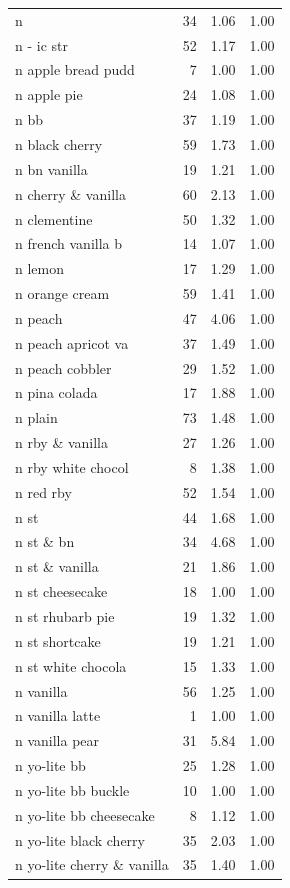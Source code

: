 \begin{table}
\begin{tabular}{lrrr}
n & 34 & 1.06 & 1.00 \\
n - ic str & 52 & 1.17 & 1.00 \\
n apple bread pudd & 7 & 1.00 & 1.00 \\
n apple pie & 24 & 1.08 & 1.00 \\
n bb & 37 & 1.19 & 1.00 \\
n black cherry & 59 & 1.73 & 1.00 \\
n bn vanilla & 19 & 1.21 & 1.00 \\
n cherry \& vanilla & 60 & 2.13 & 1.00 \\
n clementine & 50 & 1.32 & 1.00 \\
n french vanilla b & 14 & 1.07 & 1.00 \\
n lemon & 17 & 1.29 & 1.00 \\
n orange cream & 59 & 1.41 & 1.00 \\
n peach & 47 & 4.06 & 1.00 \\
n peach apricot va & 37 & 1.49 & 1.00 \\
n peach cobbler & 29 & 1.52 & 1.00 \\
n pina colada & 17 & 1.88 & 1.00 \\
n plain & 73 & 1.48 & 1.00 \\
n rby \& vanilla & 27 & 1.26 & 1.00 \\
n rby white chocol & 8 & 1.38 & 1.00 \\
n red rby & 52 & 1.54 & 1.00 \\
n st & 44 & 1.68 & 1.00 \\
n st \& bn & 34 & 4.68 & 1.00 \\
n st \& vanilla & 21 & 1.86 & 1.00 \\
n st cheesecake & 18 & 1.00 & 1.00 \\
n st rhubarb pie & 19 & 1.32 & 1.00 \\
n st shortcake & 19 & 1.21 & 1.00 \\
n st white chocola & 15 & 1.33 & 1.00 \\
n vanilla & 56 & 1.25 & 1.00 \\
n vanilla latte & 1 & 1.00 & 1.00 \\
n vanilla pear & 31 & 5.84 & 1.00 \\
n yo-lite bb & 25 & 1.28 & 1.00 \\
n yo-lite bb buckle & 10 & 1.00 & 1.00 \\
n yo-lite bb cheesecake & 8 & 1.12 & 1.00 \\
n yo-lite black cherry & 35 & 2.03 & 1.00 \\
n yo-lite cherry \& vanilla & 35 & 1.40 & 1.00 \\

\end{tabular}
\end{table}

